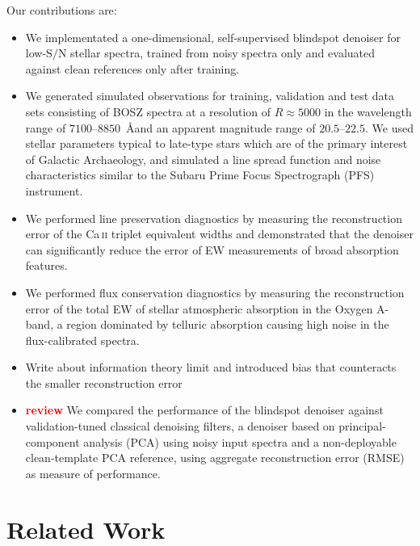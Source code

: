 \documentclass[twocolumn]{aastex7}
\newcommand{\ld}[1]{\textcolor{red}{\textbf{#1}}}
\newcommand{\SNR}{\mathrm{S}/\mathrm{N}}
\begin{document}
Our contributions are:
\begin{itemize}
    \item We implementated a one-dimensional, self-supervised blindspot denoiser for low-$\SNR$ stellar spectra, trained from noisy spectra only and evaluated against clean references only after training.
    \item We generated simulated observations for training, validation and test data sets consisting of BOSZ \citep{Bohlin2017} spectra at a resolution of $R \approx 5000$ in the wavelength range of $7100$--$8850$~\AA and an apparent magnitude range of $20.5$--$22.5$. We used stellar parameters typical to late-type stars which are of the primary interest of Galactic Archaeology, and simulated a line spread function and noise characteristics similar to the Subaru Prime Focus Spectrograph (PFS) instrument.
    \item We performed line preservation diagnostics by measuring the reconstruction error of the Ca\,\textsc{ii} triplet equivalent widths and demonstrated that the denoiser can significantly reduce the error of EW measurements of broad absorption features.
    \item We performed flux conservation diagnostics by measuring the reconstruction error of the total EW of stellar atmospheric absorption in the Oxygen A-band, a region dominated by telluric absorption causing high noise in the flux-calibrated spectra.
    \item {Write about information theory limit and introduced bias that counteracts the smaller reconstruction error}
    \item \ld{review} We compared the performance of the blindspot denoiser against validation-tuned classical denoising filters, a denoiser based on principal-component analysis (PCA) using noisy input spectra and a non-deployable clean-template PCA reference, using aggregate reconstruction error (RMSE) as measure of performance.
\end{itemize}

\section{Related Work}
\label{sec:related_work}
\end{document}
